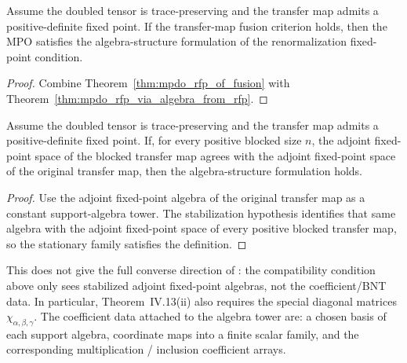 \begin{theorem}%
    \label{thm:mpdo_rfp_via_algebra_from_fusion}
    \leanok
    Assume the doubled tensor is trace-preserving and the transfer map admits a
    positive-definite fixed point. If the transfer-map fusion criterion holds,
    then the MPO satisfies the algebra-structure formulation of the
    renormalization fixed-point condition.
\end{theorem}
\begin{proof}\leanok
    Combine Theorem~\ref{thm:mpdo_rfp_of_fusion} with
    Theorem~\ref{thm:mpdo_rfp_via_algebra_from_rfp}.
\end{proof}

\begin{theorem}%
    \label{thm:mpdo_algebra_from_stabilized_adjoint_fixedpoints}
    \leanok
    Assume the doubled tensor is trace-preserving and the transfer map admits a
    positive-definite fixed point. If, for every positive blocked size $n$, the
    adjoint fixed-point space of the blocked transfer map agrees with the
    adjoint fixed-point space of the original transfer map, then the
    algebra-structure formulation holds.
\end{theorem}
\begin{proof}\leanok
    Use the adjoint fixed-point algebra of the original transfer map as a constant
    support-algebra tower. The stabilization hypothesis identifies that same
    algebra with the adjoint fixed-point space of every positive blocked transfer
    map, so the stationary family satisfies the definition.
\end{proof}

This does not give the full converse direction of
\cite[Theorem~4.14]{Cirac2016MPDO_arXiv}: the compatibility condition above
only sees stabilized adjoint fixed-point algebras, not the coefficient/BNT data.
In particular, Theorem~IV.13(ii) also requires the special diagonal matrices
$\chi_{\alpha,\beta,\gamma}$. The coefficient data attached to the algebra tower are:
a chosen basis of each support algebra, coordinate maps into a finite scalar
family, and the corresponding multiplication / inclusion coefficient arrays.

